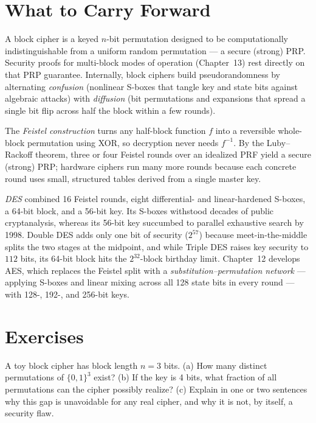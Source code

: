 \section{What to Carry Forward}
\label{ch11:summary}

A block cipher is a keyed $n$-bit permutation designed to be computationally indistinguishable from a uniform random permutation --- a secure (strong) PRP. Security proofs for multi-block modes of operation (Chapter~13) rest directly on that PRP guarantee. Internally, block ciphers build pseudorandomness by alternating \emph{confusion} (nonlinear S-boxes that tangle key and state bits against algebraic attacks) with \emph{diffusion} (bit permutations and expansions that spread a single bit flip across half the block within a few rounds).

The \emph{Feistel construction} turns any half-block function $f$ into a reversible whole-block permutation using XOR, so decryption never needs $f^{-1}$. By the Luby--Rackoff theorem, three or four Feistel rounds over an idealized PRF yield a secure (strong) PRP; hardware ciphers run many more rounds because each concrete round uses small, structured tables derived from a single master key.

\emph{DES} combined 16 Feistel rounds, eight differential- and linear-hardened S-boxes, a 64-bit block, and a 56-bit key. Its S-boxes withstood decades of public cryptanalysis, whereas its 56-bit key succumbed to parallel exhaustive search by 1998. Double DES adds only one bit of security ($2^{57}$) because meet-in-the-middle splits the two stages at the midpoint, and while Triple DES raises key security to $112$ bits, its 64-bit block hits the $2^{32}$-block birthday limit. Chapter~12 develops AES, which replaces the Feistel split with a \emph{substitution--permutation network} --- applying S-boxes and linear mixing across all 128 state bits in every round --- with 128-, 192-, and 256-bit keys.

\section*{Exercises}

\begin{exercise}
\label{ch11:ex-perm-count}
A toy block cipher has block length $n = 3$ bits. (a) How many distinct permutations of $\{0,1\}^3$ exist? (b) If the key is 4 bits, what fraction of all permutations can the cipher possibly realize? (c) Explain in one or two sentences why this gap is unavoidable for any real cipher, and why it is not, by itself, a security flaw.
\end{exercise}

